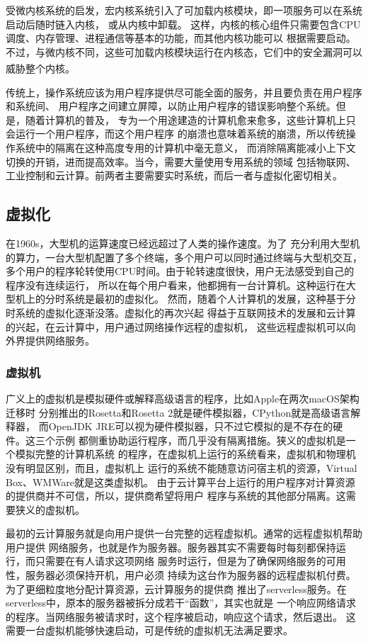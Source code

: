 \documentclass[UTF8,fontset=none,linespread=1.15]{ctexart}
\let\nosupcite\cite
\renewcommand*{\cite}[1]{\textsuperscript{\nosupcite{#1}}}
\begin{document}
受微内核系统的启发，宏内核系统引入了可加载内核模块，即一项服务可以在系统启动后随时链入内核，
或从内核中卸载。
这样，内核的核心组件只需要包含CPU调度、内存管理、进程通信等基本的功能，而其他内核功能可以
根据需要启动。不过，与微内核不同，这些可加载内核模块运行在内核态，它们中的安全漏洞可以
威胁整个内核。\cite{bib:os-concept}

传统上，操作系统应该为用户程序提供尽可能全面的服务，并且要负责在用户程序和系统间、
用户程序之间建立屏障，以防止用户程序的错误影响整个系统。但是，随着计算机的普及，
专为一个用途建造的计算机愈来愈多，这些计算机上只会运行一个用户程序，而这个用户程序
的崩溃也意味着系统的崩溃，所以传统操作系统中的隔离在这种高度专用的计算机中毫无意义，
而消除隔离能减小上下文切换的开销，进而提高效率。当今，需要大量使用专用系统的领域
包括物联网、工业控制和云计算。前两者主要需要实时系统，而后一者与虚拟化密切相关。

\subsection{虚拟化}
在1960s，大型机的运算速度已经远超过了人类的操作速度。为了
充分利用大型机的算力，一台大型机配置了多个终端，多个用户可以同时通过终端与大型机交互，
多个用户的程序轮转使用CPU时间。由于轮转速度很快，用户无法感受到自己的程序没有连续运行，
所以在每个用户看来，他都拥有一台计算机。这种运行在大型机上的分时系统是最初的虚拟化。
然而，随着个人计算机的发展，这种基于分时系统的虚拟化逐渐没落。虚拟化的再次兴起
得益于互联网技术的发展和云计算的兴起，在云计算中，用户通过网络操作远程的虚拟机，
这些远程虚拟机可以向外界提供网络服务。

\subsubsection{虚拟机}
广义上的虚拟机是模拟硬件或解释高级语言的程序，比如Apple在两次macOS架构迁移时
分别推出的Rosetta和Rosetta 2就是硬件模拟器，CPython就是高级语言解释器，
而OpenJDK JRE可以视为硬件模拟器，只不过它模拟的是不存在的硬件。这三个示例
都侧重协助运行程序，而几乎没有隔离措施。狭义的虚拟机是一个模拟完整的计算机系统
的程序，在虚拟机上运行的系统看来，虚拟机和物理机没有明显区别，而且，虚拟机上
运行的系统不能随意访问宿主机的资源，Virtual Box、WMWare就是这类虚拟机。
由于云计算平台上运行的用户程序对计算资源的提供商并不可信，所以，提供商希望将用户
程序与系统的其他部分隔离。这需要狭义的虚拟机。

最初的云计算服务就是向用户提供一台完整的远程虚拟机。通常的远程虚拟机帮助用户提供
网络服务，也就是作为服务器。服务器其实不需要每时每刻都保持运行，而只需要在有人请求这项网络
服务时运行，但是为了确保网络服务的可用性，服务器必须保持开机，用户必须
持续为这台作为服务器的远程虚拟机付费。为了更细粒度地分配计算资源，云计算服务的提供商
推出了serverless服务。在serverless中，原本的服务器被拆分成若干“函数”，其实也就是
一个响应网络请求的程序。当网络服务被请求时，这个程序被启动，响应这个请求，然后退出。
这需要一台虚拟机能够快速启动，可是传统的虚拟机无法满足要求。
\end{document}
